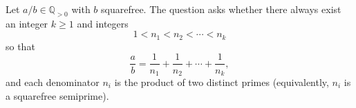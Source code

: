 Let $a/b\in\mathbb{Q}_{>0}$ with $b$ squarefree. The question asks whether there always exist an integer $k\ge 1$ and integers
\[
  1<n_1<n_2<\cdots<n_k
\]
so that
\[
  \frac{a}{b} = \frac{1}{n_1}+\frac{1}{n_2}+\cdots+\frac{1}{n_k},
\]
and each denominator $n_i$ is the product of two distinct primes (equivalently, $n_i$ is a squarefree semiprime).
